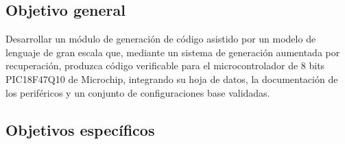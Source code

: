 \subsection*{Objetivo general}

Desarrollar un módulo de generación de código asistido por un modelo de lenguaje
de gran escala que, mediante un sistema de generación aumentada por
recuperación, produzca código verificable para el microcontrolador de 8 bits
PIC18F47Q10 de Microchip, integrando su hoja de datos, la documentación de los
periféricos y un conjunto de configuraciones base validadas.

\subsection*{Objetivos específicos}

